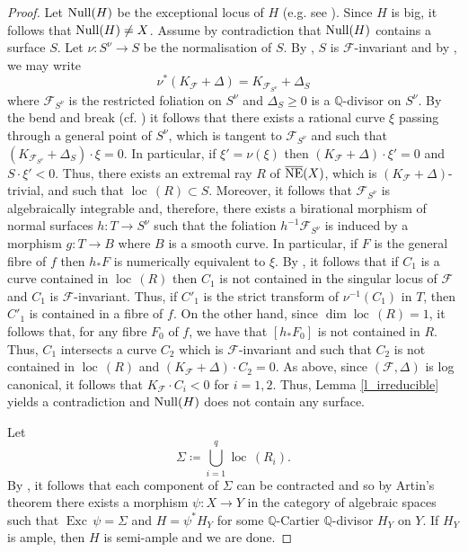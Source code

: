 \documentclass[12pt]{amsart}
\newcommand{\exc}[1]{\operatorname{Exc} \, #1}
\newcommand{\loc}[1]{\operatorname{loc} \, #1}
\newcommand{\cal}[1]{\mathcal{#1}}
\begin{document}
\begin{proof}
\medskip


Let $ {\rm Null}(H)$ be the exceptional locus of $H$ (e.g. see \cite[Section 2.12]{CS20}). Since $H$ is big, it follows that $ {\rm Null}(H)\neq X$. Assume by contradiction that  ${\rm Null}(H)$ contains a surface $S$. Let $\nu\colon S^{\nu}\to S$ be the normalisation of $S$.  By \cite[Corollary 4.9]{CS23b}, $S$ is $\cal F$-invariant and by 
\cite[Proposition-Definition 3.7]{CS23b}, we may write
\[
\nu^*(K_\cal F+\Delta)=K_{\mathcal F_{S^{\nu}}}+\Delta_S
\] 
where $\mathcal F_{S^{\nu}}$ is the restricted foliation on $S^{\nu}$ and  $\Delta_S\ge 0$ is a $\mathbb Q$-divisor on $S^{\nu}$. By the bend and break (cf. \cite[Corollary 2.28] {Spicer20}) it follows that there exists a rational curve $\xi$ passing through a general point of $S^{\nu}$, which is tangent to $\cal F_{S^{\nu}}$ and such that $(K_{\mathcal F_{S^{\nu}}}+\Delta_S)\cdot \xi=0$. In particular, if $\xi'=\nu(\xi)$ then $(K_{\cal F}+\Delta)\cdot \xi' =0$ and 
 $S\cdot \xi'<0$.  Thus, there exists an extremal ray $R$ of $\overline{{\rm NE}}(X)$, which is $(K_{\cal F}+\Delta)$-trivial, and such that $\loc (R)\subset S$.
Moreover, it follows that $\cal F_{S^\nu}$ is algebraically integrable and, therefore,  there exists a birational morphism of normal surfaces $h\colon T\to S^\nu$  such that the foliation $h^{-1}\cal F_{S^{\nu}}$ is induced by a morphism $g\colon T\to B$ where $B$ is a smooth curve. In particular, if $F$ is the general fibre of $f$ then $h_*F$ is numerically equivalent to $\xi$.  
By \cite[Remark 2.31]{CS20}, it follows that if $C_1$  is a curve contained in  $\loc (R)$ then $C_1$ is not contained in the singular locus of $\cal F$ and $C_1$ is $\cal F$-invariant. Thus, if $C'_1$ is the strict transform of $\nu^{-1}(C_1)$ in $T$, then $C'_1$ is contained in a fibre of $f$. On the other hand, 
since $\dim \loc (R)=1$, it follows that, for any fibre $F_0$ of $f$, we have that  $[h_*F_0]$ is not contained in $R$. Thus, $C_1$ intersects a curve $C_2$ which is $\cal F$-invariant and such that $C_2$ is not contained in $\loc(R)$ and $(K_{\cal F}+\Delta)\cdot C_2=0$. As above, since $(\cal F,\Delta)$ is log canonical, it follows that $K_{\cal F}\cdot C_i<0$ for $i=1,2$.  
 Thus,  Lemma \ref{l_irreducible} yields a contradiction and ${\rm Null}(H)$ does not contain any surface. 



 Let 
\[
\Sigma \coloneq  \bigcup_{i=1}^q \loc (R_i).
\]
 By \cite[Theorem 8.8]{CS20}, it follows that each component of $\Sigma$ can be contracted and so by Artin's theorem  \cite[Theorem 6.2]{Artin70} there exists a morphism $\psi\colon X\to Y$ in the category of algebraic spaces such that 
$\exc \psi = \Sigma$ 
and $H=\psi^*H_Y$ for some $\mathbb Q$-Cartier $\mathbb Q$-divisor $H_Y$ on $Y$. If $H_Y$ is ample, then $H$ is semi-ample and we are done. 


\end{proof}
\end{document}
